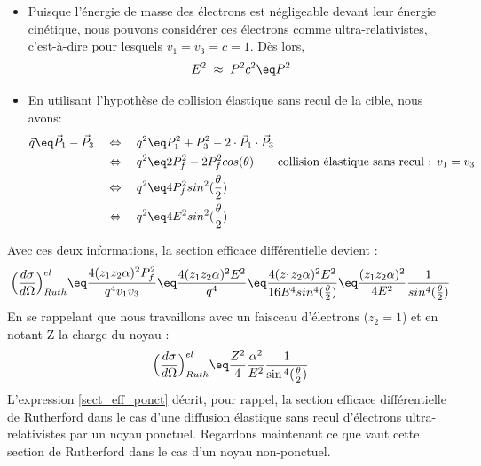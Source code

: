 \begin{itemize}[label=$\bullet$]

    \item Puisque l'énergie de masse des électrons est négligeable devant leur énergie cinétique, nous pouvons considérer ces électrons comme ultra-relativistes, c'est-à-dire pour lesquels $v_1=v_3=c=1$. Dès lors,
    \begin{equation*}
        E^2 \;\approx\; P^2c^2 \eq P^2
    \end{equation*}
    
    \item En utilisant l'hypothèse de collision élastique sans recul de la cible, nous avons:
    \begin{align*}
        \vec{q} \eq \vec{P}_1 - \vec{P}_3
            &\quad \Leftrightarrow \quad
        q^2 \eq P_1^2 + P_3^2 - 2 \cdot \vec{P}_1 \cdot \vec{P}_3\\
            &\quad \Leftrightarrow \quad
        q^2 \eq 2 P_f^2 - 2 P_f^2 cos(\theta)
        \qquad \text{collision élastique sans recul : } v_1=v_3\\
            &\quad \Leftrightarrow \quad
        q^2 \eq 4 P_f^2 sin^2(\frac{\theta}{2})\\
            &\quad \Leftrightarrow \quad
        q^2 \eq 4 E^2   sin^2(\frac{\theta}{2})
    \end{align*}
\end{itemize}
Avec ces deux informations, la section efficace différentielle devient :
\begin{equation*}
    \Big(  \dfrac{d\sigma}{d\Omega}  \Big)^{el}_{Ruth}
    \eq
    \dfrac{4 (z_1 z_2 \alpha)^2 P_f^2}{q^4v_1v_3}
    \eq
    \dfrac{4 (z_1 z_2 \alpha)^2 E^2}{q^4}
    \eq
    \dfrac{4 (z_1 z_2 \alpha)^2 E^2}{16 E^4 sin^4(\frac{\theta}{2})}
    \eq
    \dfrac{(z_1 z_2 \alpha)^2}{4E^2}
    \dfrac{1}{sin^4(\frac{\theta}{2})}
\end{equation*}
En se rappelant que nous travaillons avec un faisceau d'électrons ($z_2 = 1$) et en notant Z la charge du noyau : 
\begin{equation}
    \Big(  \dfrac{d\sigma}{d\Omega}  \Big)^{el}_{Ruth}
    \eq
    \dfrac{Z^2}{4}\dfrac{\alpha^2}{E^2}\dfrac{1}{\sin{^4(\frac{\theta}{2})}}
    \label{sect_eff_ponct}
\end{equation}
L'expression \ref{sect_eff_ponct} décrit, pour rappel, la section efficace différentielle de Rutherford dans le cas d'une diffusion élastique sans recul d'électrons ultra-relativistes par un noyau ponctuel. Regardons maintenant ce que vaut cette section de Rutherford dans le cas d'un noyau non-ponctuel.


